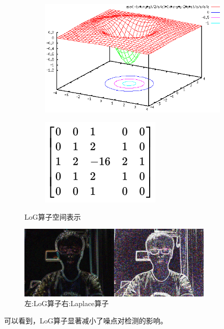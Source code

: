 \begin{figure}[H]
	\centering
	\begin{subfigure}[ht]{0.3\textwidth}
		\centering
		\includegraphics[height=0.7\textwidth]{figures/LoG_plot.png}
	\end{subfigure}
\qquad \qquad \qquad
	\begin{subfigure}[ht]{0.3\textwidth}
		\centering
		\includegraphics[height=0.7\textwidth]{figures/LoG_table}
	\end{subfigure}
\caption{LoG算子空间表示}
\end{figure}
\begin{figure}[htbp]
\centering
\includegraphics[height=3.5cm]{figures/LoG.png}
\caption{左:LoG算子\qquad \qquad \qquad \qquad 右:Laplace算子}
\end{figure}\par
可以看到，LoG算子显著减小了噪点对检测的影响。
